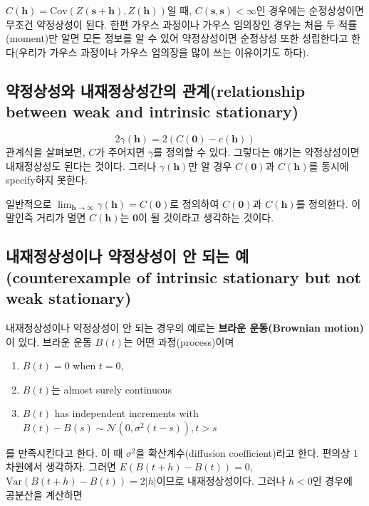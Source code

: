 \documentclass[b5paper,]{scrbook}
\providecommand{\tightlist}{%
  \setlength{\itemsep}{0pt}\setlength{\parskip}{0pt}}
\theoremstyle{plain}
\theoremstyle{definition}
\numberwithin{equation}{section}
\begin{document}
\(C(\mathbf{h})=\text{Cov}(Z(\mathbf{s}+\mathbf{h}), Z(\mathbf{h}))\)일 때, \(C(\mathbf{s},\mathbf{s}) < \infty\)인 경우에는 순정상성이면 무조건 약정상성이 된다. 한편 가우스 과정이나 가우스 임의장인 경우는 처음 두 적률(moment)만 알면 모든 정보를 알 수 있어 약정상성이면 순정상성 또한 성립한다고 한다(우리가 가우스 과정이나 가우스 임의장을 많이 쓰는 이유이기도 하다).

\hypertarget{--relationship-between-weak-and-intrinsic-stationary}{%
\subsection{약정상성와 내재정상성간의 관계(relationship between weak and intrinsic stationary)}\label{--relationship-between-weak-and-intrinsic-stationary}}

\[2\gamma(\mathbf{h})=2(C(\mathbf{0})-c(\mathbf{h}))\]
관계식을 살펴보면, \(C\)가 주어지면 \(\gamma\)를 정의할 수 있다. 그렇다는 얘기는 약정상성이면 내재정상성도 된다는 것이다. 그러나 \(\gamma(\mathbf{h})\)만 알 경우 \(C(\mathbf{0})\)과 \(C(\mathbf{h})\)를 동시에 specify하지 못한다.

일반적으로 \(\lim_{\mathbf{h}\rightarrow \infty}\gamma(\mathbf{h})=C(\mathbf{0})\)로 정의하여 \(C(\mathbf{0})\)과 \(C(\mathbf{h})\)를 정의한다. 이 말인즉 거리가 멀면 \(C(\mathbf{h})\)는 \(\mathbf{0}\)이 될 것이라고 생각하는 것이다.

\hypertarget{----counterexample-of-intrinsic-stationary-but-not-weak-stationary}{%
\subsection{내재정상성이나 약정상성이 안 되는 예(counterexample of intrinsic stationary but not weak stationary)}\label{----counterexample-of-intrinsic-stationary-but-not-weak-stationary}}

내재정상성이나 약정상성이 안 되는 경우의 예로는 \textbf{브라운 운동(Brownian motion)}이 있다. 브라운 운동 \(B(t)\)는 어떤 과정(process)이며

\begin{enumerate}
\def\labelenumi{\arabic{enumi}.}
\tightlist
\item
  \(B(t)=0\) when \(t=0\),
\item
  \(B(t)\)는 almost surely continuous
\item
  \(B(t)\) has independent increments with \(B(t)-B(s) \sim \mathcal{N}(0,\sigma^{2}(t-s)), t>s\)
\end{enumerate}

를 만족시킨다고 한다. 이 때 \(\sigma^{2}\)을 확산계수(diffusion coefficient)라고 한다. 편의상 1차원에서 생각하자. 그러면 \(E(B(t+h)-B(t))=0\), \(\text{Var}(B(t+h)-B(t))=2|h|\)이므로 내재정상성이다. 그러나 \(h < 0\)인 경우에 공분산을 계산하면
\end{document}

